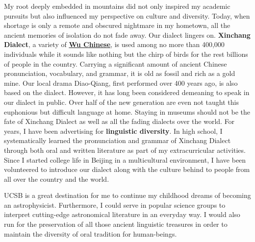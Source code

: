 \documentclass[11pt, a4paper]{awesome-cv} %
\begin{document}
\begin{cvletter}
My root deeply embedded in mountains did not only inspired my academic pursuits but also influenced my perspective on culture and diversity. Today, when shortage is only a remote and obscured nightmare in my hometown, all the ancient memories of isolation do not fade away. Our dialect lingers on. \textbf{Xinchang Dialect}, a variety of \href{https://en.wikipedia.org/wiki/Wu_Chinese}{\textbf{Wu Chinese}}, is used among no more than 400,000 individuals while it sounds like nothing but the chirp of birds for the rest billions of people in the country. Carrying a significant amount of ancient Chinese pronunciation, vocabulary, and grammar, it is old as fossil and rich as a gold mine. Our local drama Diao-Qiang, first performed over 400 years ago, is also based on the dialect. However, it has long been considered demeaning to speak in our dialect in public. Over half of the new generation are even not taught this euphonious but difficult language at home. Staying in museums should not be the fate of Xinchang Dialect as well as all the fading dialects over the world. For years, I have been advertising for \textbf{linguistic diversity}. In high school, I systematically learned the pronunciation and grammar of Xinchang Dialect through both oral and written literature as part of my extracurricular activities. Since I started college life in Beijing in a multicultural environment, I have been volunteered to introduce our dialect along with the culture behind to people from all over the country and the world. 

UCSB is a great destination for me to continue my childhood dreams of becoming an astrophysicist. Furthermore, I could serve in popular science groups to interpret cutting-edge astronomical literature in an everyday way. I would also run for the preservation of all those ancient linguistic treasures in order to maintain the diversity of oral tradition for human-beings.


\end{cvletter}


\end{document}
